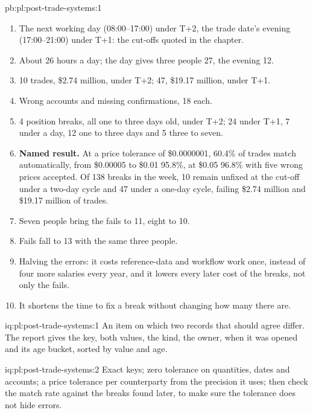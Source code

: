 \begin{solution}{pb:pl:post-trade-systems:1}
\begin{enumerate}
\item The next working day (08:00--17:00) under T+2, the trade date's evening (17:00--21:00) under T+1: the cut-offs quoted in the chapter.
\item About 26 hours a day; the day gives three people 27, the evening 12.
\item 10 trades, \$2.74 million, under T+2; 47, \$19.17 million, under T+1.
\item Wrong accounts and missing confirmations, 18 each.
\item 4 position breaks, all one to three days old, under T+2; 24 under T+1, 7 under a day, 12 one to three days and 5 three to seven.
\item \textbf{Named result.} At a price tolerance of \$0.0000001, 60.4\% of trades match automatically, from \$0.00005 to \$0.01 95.8\%, at
\$0.05 96.8\% with five wrong prices accepted. Of 138 breaks in the week, 10 remain unfixed at the cut-off under a two-day cycle and 47 under a
one-day cycle, failing \$2.74 million and \$19.17 million of trades.
\item Seven people bring the fails to 11, eight to 10.
\item Fails fall to 13 with the same three people.
\item Halving the errors: it costs reference-data and workflow work once, instead of four more salaries every year, and it lowers every later
cost of the breaks, not only the fails.
\item It shortens the time to fix a break without changing how many there are.
\end{enumerate}
\end{solution}

\begin{solution}{iq:pl:post-trade-systems:1}
An item on which two records that should agree differ. The report gives the key, both values, the kind, the owner, when it was opened and its
age bucket, sorted by value and age.
\end{solution}

\begin{solution}{iq:pl:post-trade-systems:2}
Exact keys; zero tolerance on quantities, dates and accounts; a price tolerance per counterparty from the precision it uses; then check the match
rate against the breaks found later, to make sure the tolerance does not hide errors.
\end{solution}

